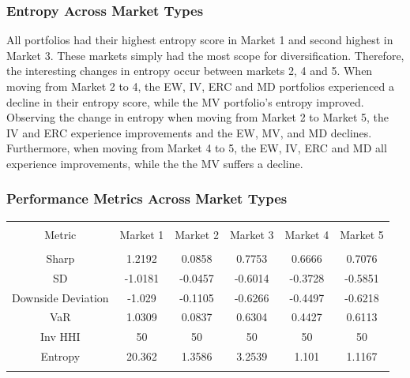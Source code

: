 \documentclass[11pt,preprint, authoryear]{elsarticle}
\let\origtable\table
\let\endorigtable\endtable
\renewenvironment{table}[1][2] {
    \expandafter\origtable\expandafter[H]
} {
    \endorigtable
}
\numberwithin{equation}{section}
\numberwithin{figure}{section}
\numberwithin{table}{section}
\begin{document}
\hypertarget{entropy-across-market-types}{%
\subsubsection{\texorpdfstring{Entropy Across Market Types
\label{entropych}}{Entropy Across Market Types }}\label{entropy-across-market-types}}

All portfolios had their highest entropy score in Market 1 and second
highest in Market 3. These markets simply had the most scope for
diversification. Therefore, the interesting changes in entropy occur
between markets 2, 4 and 5. When moving from Market 2 to 4, the EW, IV,
ERC and MD portfolios experienced a decline in their entropy score,
while the MV portfolio's entropy improved. Observing the change in
entropy when moving from Market 2 to Market 5, the IV and ERC experience
improvements and the EW, MV, and MD declines. Furthermore, when moving
from Market 4 to 5, the EW, IV, ERC and MD all experience improvements,
while the the MV suffers a decline.

\hypertarget{performance-metrics-across-market-types}{%
\subsubsection{\texorpdfstring{Performance Metrics Across Market Types
\label{perf}}{Performance Metrics Across Market Types }}\label{performance-metrics-across-market-types}}

\begin{table}[!htbp] \centering 
  \caption{Equal Weight} 
  \label{ew} 
\begin{tabular}{@{\extracolsep{5pt}} cccccc} 
\\[-1.8ex]\hline 
\hline \\[-1.8ex] 
Metric & Market 1 & Market 2 & Market 3 & Market 4 & Market 5 \\ 
\hline \\[-1.8ex] 
Sharp & 1.2192 & 0.0858 & 0.7753 & 0.6666 & 0.7076 \\ 
SD & -1.0181 & -0.0457 & -0.6014 & -0.3728 & -0.5851 \\ 
Downside Deviation & -1.029 & -0.1105 & -0.6266 & -0.4497 & -0.6218 \\ 
VaR & 1.0309 & 0.0837 & 0.6304 & 0.4427 & 0.6113 \\ 
Inv HHI & 50 & 50 & 50 & 50 & 50 \\ 
Entropy & 20.362 & 1.3586 & 3.2539 & 1.101 & 1.1167 \\ 
\hline \\[-1.8ex] 
\end{tabular} 
\end{table}
\end{document}
